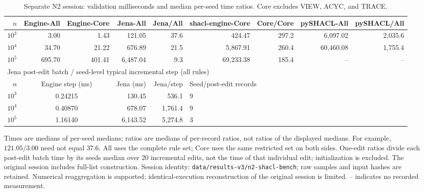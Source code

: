 \begin{table}[t]
\centering\scriptsize
\caption{Separate N2 session: validation milliseconds and median per-seed time ratios. Core excludes VIEW, ACYC, and TRACE.}
\label{tab:shacl}
\setlength{\tabcolsep}{5pt}
\begin{tabular}{@{}rrrrrrrrr@{}}
\toprule
$n$ & Engine-All & Engine-Core & Jena-All & Jena/All & shacl-engine-Core & Core/Core & pySHACL-All & pySHACL/All \\
\midrule
$10^3$ & 3.00 & 1.43 & 121.05 & 37.6 & 424.47 & 297.2 & 6,097.02 & 2,035.6 \\
$10^4$ & 34.70 & 21.22 & 676.89 & 21.5 & 5,867.91 & 260.4 & 60,460.08 & 1,755.4 \\
$10^5$ & 695.70 & 401.41 & 6,487.04 & 9.3 & 69,233.38 & 185.4 & -- & -- \\
\midrule
\multicolumn{9}{l}{Jena post-edit batch / seed-level typical incremental step (all rules)}\\
$n$ & \multicolumn{2}{c}{Engine step (ms)} & Jena (ms) & Jena/step & \multicolumn{4}{l}{Seed/post-edit records}\\
$10^3$ & \multicolumn{2}{c}{0.24215} & 130.45 & 536.1 & \multicolumn{4}{l}{9}\\
$10^4$ & \multicolumn{2}{c}{0.40870} & 678.07 & 1,761.4 & \multicolumn{4}{l}{9}\\
$10^5$ & \multicolumn{2}{c}{1.16140} & 6,143.52 & 5,274.8 & \multicolumn{4}{l}{3}\\
\bottomrule
\end{tabular}
\begin{minipage}{0.98\textwidth}\footnotesize
Times are medians of per-seed medians; ratios are medians of per-record ratios, not ratios of the displayed medians. For example, $121.05/3.00$ need not equal 37.6. All uses the complete rule set; Core uses the same restricted set on both sides. One-edit ratios divide each post-edit batch time by its seed\textquotesingle s median over 20 incremental edits, not the time of that individual edit; initialization is excluded. The original session includes full-list construction. Session identity: \texttt{data/results-v3/n2-shacl-bench}; raw samples and input hashes are retained. Numerical reaggregation is supported; identical-execution reconstruction of the original session is limited. -- indicates no recorded measurement.
\end{minipage}
\end{table}
